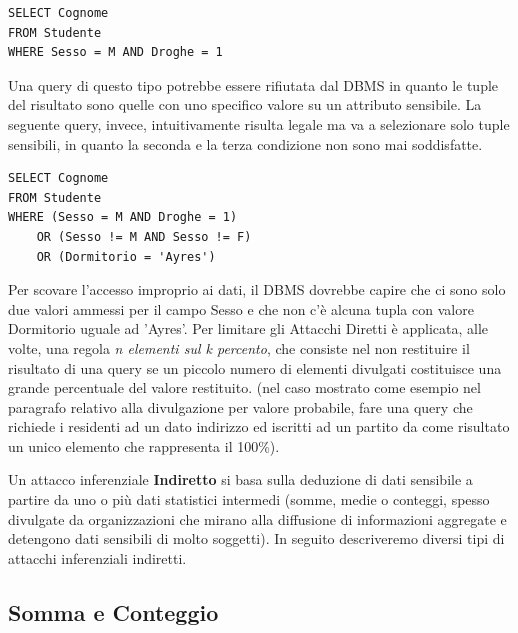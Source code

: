 \begin{algorithm}
\begin{lstlisting}[caption={Query che sfrutta inferenza per ottenere dati sensibili e viene bloccata}]
SELECT Cognome
FROM Studente
WHERE Sesso = M AND Droghe = 1
\end{lstlisting}
\end{algorithm}

Una query di questo tipo potrebbe essere rifiutata dal DBMS in quanto le tuple del risultato sono quelle con uno specifico valore su un attributo sensibile. La seguente query, invece, intuitivamente risulta legale ma va a selezionare solo tuple sensibili, in quanto la seconda e la terza condizione non sono mai soddisfatte.

\begin{algorithm}
\begin{lstlisting}[caption={Query che sfrutta inferenza per ottenere dati sensibili e non viene bloccata}]
SELECT Cognome
FROM Studente
WHERE (Sesso = M AND Droghe = 1)
	OR (Sesso != M AND Sesso != F)
	OR (Dormitorio = 'Ayres')
\end{lstlisting}
\end{algorithm}

Per scovare l'accesso improprio ai dati, il DBMS dovrebbe capire che ci sono solo due valori ammessi per il campo Sesso e che non c'è alcuna tupla con valore Dormitorio uguale ad 'Ayres'. Per limitare gli Attacchi Diretti è applicata, alle volte, una regola \textit{n elementi sul k percento}, che consiste nel non restituire il risultato di una query se un piccolo numero di elementi divulgati costituisce una grande percentuale del valore restituito. (nel caso mostrato come esempio nel paragrafo relativo alla divulgazione per valore probabile, fare una query che richiede i residenti ad un dato indirizzo ed iscritti ad un partito da come risultato un unico elemento che rappresenta il 100\%).

Un attacco inferenziale \textbf{Indiretto} si basa sulla deduzione di dati sensibile a partire da uno o più dati statistici intermedi (somme, medie o conteggi, spesso divulgate da organizzazioni che mirano alla diffusione di informazioni aggregate e detengono dati sensibili di molto soggetti). In seguito descriveremo diversi tipi di attacchi inferenziali indiretti.

\subsection{Somma e Conteggio}

